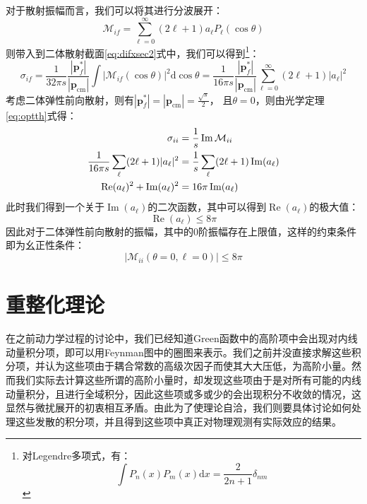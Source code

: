 对于散射振幅而言，我们可以将其进行分波展开：
\begin{equation}
    \mathcal{M}_{if} = \sum_{\ell=0}^{\infty}(2\ell + 1 )a_\ell P_\ell(\cos\theta)
\end{equation}
则带入到二体散射截面\eqref{eq:difxsec2}式中，我们可以得到\footnote{对Legendre多项式，有：\[
\int P_n (x) P_m(x) \mathrm{d}x = \frac{2}{2n + 1}\delta_{n m}
\]}：
\begin{equation}
    \sigma_{if} = \frac{1}{32\pi s} \frac{|\boldsymbol{p}_f^*|}{|\boldsymbol{p}_\mathrm{cm}|}\int|\mathcal{M}_{if}(\cos\theta)|^2 \mathrm{d}\cos\theta = \frac{1}{16\pi s}\frac{|\boldsymbol{p}_f^*|}{|\boldsymbol{p}_\mathrm{cm}|} \sum_{\ell=0}^{\infty}(2\ell + 1 )|a_\ell|^2
\end{equation}
考虑二体弹性前向散射，则有$|\boldsymbol{p}_f^*| = |\boldsymbol{p}_\mathrm{cm}| = \frac{\sqrt{s}}{2}$， 且$\theta=0$，则由光学定理\eqref{eq:optth}式得：
\begin{align}
    \sigma_{ii} &= \frac{1}{s}\operatorname{Im}{\mathcal{M}_{ii}}\notag\\
    \frac{1}{16\pi s}\sum_\ell (2\ell + 1) |a_\ell|^2 &= \frac{1}{s}\sum_\ell (2\ell +1 )\operatorname{Im}(a_\ell)\notag\\
    \operatorname{Re}(a_\ell) ^2 + \operatorname{Im}(a_\ell) ^2 &= 16\pi \operatorname{Im}(a_\ell)
\end{align}
此时我们得到一个关于$\operatorname{Im}(a_\ell)$的二次函数，其中可以得到$\operatorname{Re}(a_\ell)$的极大值：
\begin{equation}
    \operatorname{Re}(a_\ell) \leq 8\pi
\end{equation}
因此对于二体弹性前向散射的振幅，其中的0阶振幅存在上限值，这样的约束条件即为幺正性条件：
\begin{equation}
    |\mathcal{M}_{ii}(\theta = 0, \ell = 0)| \leq 8\pi
\end{equation}


\chapter{重整化理论}
在之前动力学过程的讨论中，我们已经知道Green函数中的高阶项中会出现对内线动量积分项，即可以用Feynman图中的圈图来表示。我们之前并没直接求解这些积分项，并认为这些项由于耦合常数的高级次因子而使其大大压低，为高阶小量。然而我们实际去计算这些所谓的高阶小量时，却发现这些项由于是对所有可能的内线动量积分，且进行全域积分，因此这些项或多或少的会出现积分不收敛的情况，这显然与微扰展开的初衷相互矛盾。由此为了使理论自洽，我们则要具体讨论如何处理这些发散的积分项，并且得到这些项中真正对物理观测有实际效应的结果。
